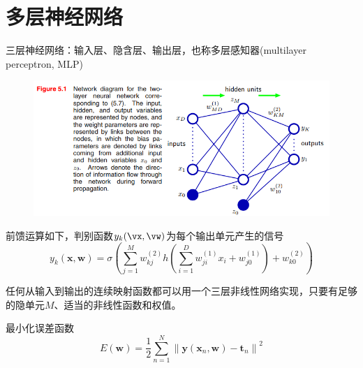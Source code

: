 
\section{多层神经网络}
三层神经网络：输入层、隐含层、输出层，也称多层感知器(multilayer perceptron, MLP)
\begin{figure}[H]
\centering
\includegraphics[width=0.8\linewidth]{fig/forward_propagation.png}
\end{figure}

前馈运算如下，判别函数$y_k(\vx,\vw)$为每个输出单元产生的信号
\[y_{k}(\mathbf{x}, \mathbf{w})=\sigma\left(\sum_{j=1}^{M} w_{k j}^{(2)} h\left(\sum_{i=1}^{D} w_{j i}^{(1)} x_{i}+w_{j 0}^{(1)}\right)+w_{k 0}^{(2)}\right)\]

任何从输入到输出的连续映射函数都可以用一个三层非线性网络实现，只要有足够的隐单元$M$、适当的非线性函数和权值。

最小化误差函数
\[E(\mathbf{w})=\frac{1}{2} \sum_{n=1}^{N}\left\|\mathbf{y}\left(\mathbf{x}_{n}, \mathbf{w}\right)-\mathbf{t}_{n}\right\|^{2}\]

